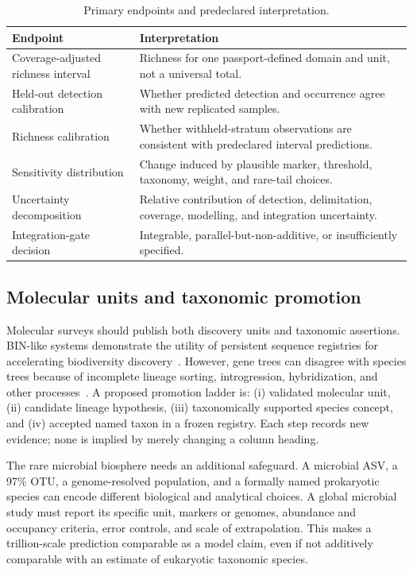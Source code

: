 \documentclass[conference]{IEEEtran}
\begin{document}
\begin{table}[t]
\caption{Primary endpoints and predeclared interpretation.}
\label{tab:endpoints}
\centering
\footnotesize
\begin{tabular}{L{0.32\columnwidth} L{0.54\columnwidth}}
\toprule
\textbf{Endpoint} & \textbf{Interpretation}\\
\midrule
Coverage-adjusted richness interval & Richness for one passport-defined domain and unit, not a universal total.\\
Held-out detection calibration & Whether predicted detection and occurrence agree with new replicated samples.\\
Richness calibration & Whether withheld-stratum observations are consistent with predeclared interval predictions.\\
Sensitivity distribution & Change induced by plausible marker, threshold, taxonomy, weight, and rare-tail choices.\\
Uncertainty decomposition & Relative contribution of detection, delimitation, coverage, modelling, and integration uncertainty.\\
Integration-gate decision & Integrable, parallel-but-non-additive, or insufficiently specified.\\
\bottomrule
\end{tabular}
\end{table}

\subsection{Molecular units and taxonomic promotion}

Molecular surveys should publish both discovery units and taxonomic assertions. BIN-like systems demonstrate the utility of persistent sequence registries for accelerating biodiversity discovery~\cite{ratnasingham2013}. However, gene trees can disagree with species trees because of incomplete lineage sorting, introgression, hybridization, and other processes~\cite{leliaert2014}. A proposed promotion ladder is: (i) validated molecular unit, (ii) candidate lineage hypothesis, (iii) taxonomically supported species concept, and (iv) accepted named taxon in a frozen registry. Each step records new evidence; none is implied by merely changing a column heading.

The rare microbial biosphere needs an additional safeguard. A microbial ASV, a 97\% OTU, a genome-resolved population, and a formally named prokaryotic species can encode different biological and analytical choices. A global microbial study must report its specific unit, markers or genomes, abundance and occupancy criteria, error controls, and scale of extrapolation. This makes a trillion-scale prediction comparable as a model claim, even if not additively comparable with an estimate of eukaryotic taxonomic species.
\end{document}
